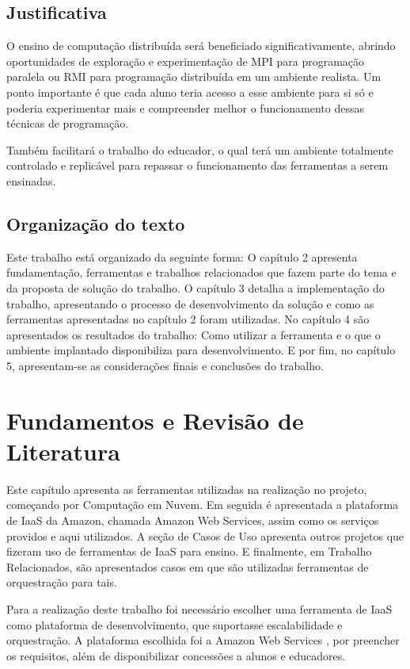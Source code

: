 \documentclass[tg]{mdtufsm}
\begin{document}
\section{Justificativa}

O ensino de computação distribuída será beneficiado significativamente, abrindo oportunidades de exploração e experimentação de MPI para programação paralela ou RMI para programação distribuída em um ambiente realista. Um ponto importante é que cada aluno teria acesso a esse ambiente para si só e poderia experimentar mais e compreender melhor o funcionamento dessas técnicas de programação.

Também facilitará o trabalho do educador, o qual terá um ambiente totalmente controlado e replicável para repassar o funcionamento das ferramentas a serem ensinadas.

\section{Organização do texto}

Este trabalho está organizado da seguinte forma: O capítulo 2 apresenta fundamentação, ferramentas e trabalhos relacionados que fazem parte do tema e da proposta de solução do trabalho.
O capítulo 3 detalha a implementação do trabalho, apresentando o processo de desenvolvimento da solução e como as ferramentas apresentadas no capítulo 2 foram utilizadas.
No capítulo 4 são apresentados os resultados do trabalho: Como utilizar a ferramenta e o que o ambiente implantado disponibiliza para desenvolvimento. E por fim, no capítulo 5, apresentam-se as considerações finais e conclusões do trabalho.

\chapter{Fundamentos e Revisão de Literatura}

Este capítulo apresenta as ferramentas utilizadas na realização no projeto, começando por Computação em Nuvem. Em seguida é apresentada a plataforma de IaaS da Amazon, chamada Amazon Web Services, assim como os serviços providos e aqui utilizados. A seção de Casos de Uso apresenta outros projetos que fizeram uso de ferramentas de IaaS para ensino. E finalmente, em Trabalho Relacionados, são apresentados casos em que são utilizadas ferramentas de orquestração para tais.

Para a realização deste trabalho foi necessário escolher uma ferramenta de IaaS como plataforma de desenvolvimento, que suportasse escalabilidade e orquestração. A plataforma escolhida foi a Amazon Web Services \cite{aws}, por preencher os requisitos, além de disponibilizar concessões a alunos e educadores.
\end{document}
